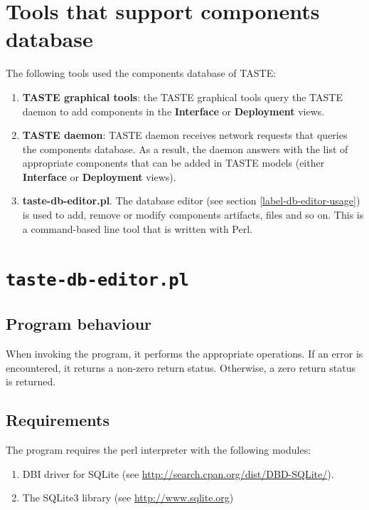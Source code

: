 \documentclass[11pt]{book}
\begin{document}
   \section{Tools that support components database}
   The following tools used the components database of TASTE:
   \begin{enumerate}
      \item
         \textbf{TASTE graphical tools}: the TASTE graphical tools query the
         TASTE daemon to add components in the \textbf{Interface} or
         \textbf{Deployment} views.
      \item
         \textbf{TASTE daemon}: TASTE daemon receives network requests that
         queries the components database. As a result, the daemon answers with
         the list of appropriate components that can be added in TASTE models
         (either \textbf{Interface} or \textbf{Deployment} views).
      \item
         \textbf{taste-db-editor.pl}. The database editor 
         (see section \ref{label-db-editor-usage}) is used to add, remove or
         modify components artifacts, files and so on. This is a command-based
         line tool that is written with Perl.
   \end{enumerate}

   \section{\texttt{taste-db-editor.pl}}

      \subsection{Program behaviour}
      When invoking the program, it performs the appropriate operations. If an error
      is encountered, it returns a non-zero return status. Otherwise, a zero return
      status is returned.

      \subsection{Requirements}
      \label{db-editor-requirements}
      The program requires the perl interpreter with the following modules:
      \begin{enumerate}
         \item
            DBI driver for SQLite (see
            \url{http://search.cpan.org/dist/DBD-SQLite/}).
         \item
            The SQLite3 library (see \url{http://www.sqlite.org})
      \end{enumerate}
\end{document}

